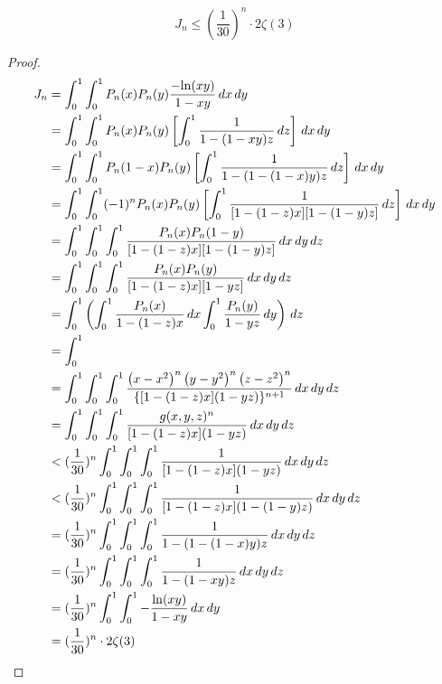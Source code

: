 \begin{lemma}\label{Jn_abs_upper}
    \[ J_n \leqslant (\frac{1}{30})^n\cdot 2\zeta(3) \]
\end{lemma}
\begin{proof}
    \begin{align*}
        J_n &= \int_{0}^{1}\int_{0}^{1} P_n(x)P_n(y)\frac{-{\rm ln}(xy)}{1-xy} \, dx \, dy \\
        &= \int_{0}^{1}\int_{0}^{1} P_n(x)P_n(y) \left[ \int_{0}^{1} \frac{1}{1 - (1 - xy)z} \, dz\right]\, dx \, dy \\
        &= \int_{0}^{1}\int_{0}^{1} P_n(1-x)P_n(y) \left[ \int_{0}^{1} \frac{1}{1 - (1 - (1-x)y)z} \, dz\right]\, dx \, dy \\
        &= \int_{0}^{1}\int_{0}^{1} (-1)^nP_n(x)P_n(y) \left[ \int_{0}^{1} \frac{1}{[1 - (1 - z)x][1 - (1 - y)z]} \, dz\right]\, dx \, dy \\
        &= \int_{0}^{1}\int_{0}^{1}\int_{0}^{1} \frac{P_n(x)P_n(1-y)}{[1 - (1 - z)x][1 - (1 - y)z]} \, dx \, dy \, dz \\
        &= \int_{0}^{1}\int_{0}^{1}\int_{0}^{1} \frac{P_n(x)P_n(y)}{[1 - (1 - z)x][1 - yz]} \, dx \, dy \, dz \\
        &= \int_{0}^{1} \left( \int_{0}^{1} \frac{P_n(x)}{1 - (1 - z)x} \, dx \int_{0}^{1} \frac{P_n(y)}{1 - yz} \, dy \right) \, dz \\
        &= \int_{0}^{1} \\
        &= \int_{0}^{1}\int_{0}^{1}\int_{0}^{1} \frac{\left(x-x^2\right)^n\left(y-y^2\right)^n\left(z-z^2\right)^n}{\{[1-(1-z) x](1-y z)\}^{n+1}} \, dx \, dy \, dz \\
        &= \int_{0}^{1}\int_{0}^{1}\int_{0}^{1} \frac{g(x, y, z)^n}{[1-(1-z)x](1-yz)} \, dx \, dy \, dz \\
        &< (\frac{1}{30})^n \int_{0}^{1}\int_{0}^{1}\int_{0}^{1} \frac{1}{[1-(1-z)x](1-yz)} \, dx \, dy \, dz \\
        &< (\frac{1}{30})^n \int_{0}^{1}\int_{0}^{1}\int_{0}^{1} \frac{1}{[1-(1-z)x](1-(1-y)z)} \, dx \, dy \, dz \\
        &= (\frac{1}{30})^n \int_{0}^{1}\int_{0}^{1}\int_{0}^{1} \frac{1}{1 - (1 - (1-x)y)z} \, dx \, dy \, dz \\
        &= (\frac{1}{30})^n \int_{0}^{1}\int_{0}^{1}\int_{0}^{1} \frac{1}{1 - (1 - xy)z} \, dx \, dy \, dz \\
        &= (\frac{1}{30})^n \int_{0}^{1}\int_{0}^{1} -\frac{{\rm ln}(xy)}{1 - xy} \, dx \, dy \\
        &= (\frac{1}{30})^n \cdot 2\zeta(3)
    \end{align*}
\end{proof}

